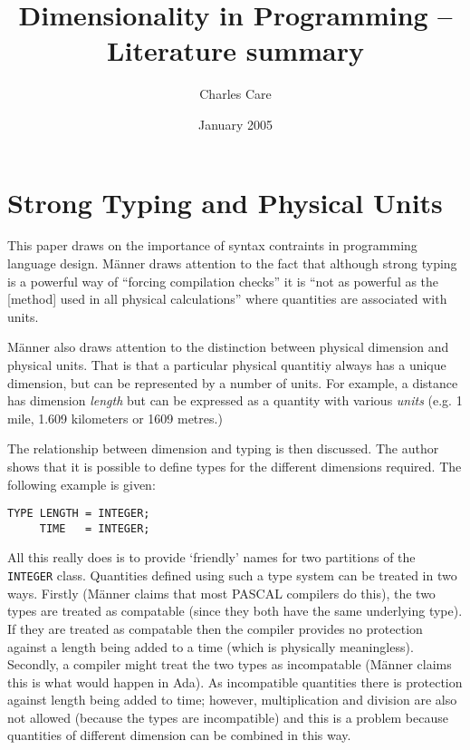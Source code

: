\documentclass[a4paper]{article}
\title{Dimensionality in Programming -- Literature summary}
\author{Charles Care}
\date{January 2005}
\begin{document}
\maketitle

\section{Strong Typing and Physical Units \cite{ME_manner}}

This paper draws on the importance of syntax contraints in programming 
language design. M\"anner draws attention to the fact that although strong 
typing is a powerful way of ``forcing compilation checks'' it is ``not as
powerful as the [method] used in all physical calculations'' where quantities 
are associated with units.

M\"anner also draws attention to the distinction between physical dimension 
and physical units. That is that a particular physical quantitiy always has a 
unique dimension, but can be represented by a number of units.
For example, a distance has dimension \emph{length} but can be expressed 
as a quantity with various \emph{units} (e.g. 1 mile, 1.609 kilometers or 
1609 metres.)

The relationship between dimension and typing is then discussed.
The author shows that it is possible to define types for the different 
dimensions required. The following example is given:

\begin{verbatim}
TYPE LENGTH = INTEGER;
     TIME   = INTEGER;
\end{verbatim}

All this really does is to provide `friendly' names for two partitions of the
\texttt{INTEGER} class. Quantities defined using such a type system can be 
treated in two ways. Firstly (M\"anner claims that most PASCAL compilers 
do this), the two types are treated as compatable (since they both have 
the same underlying type). If they are treated as compatable then the compiler
provides no protection against a length being added to a time (which is 
physically meaningless). Secondly, a compiler might treat the two types as
incompatable (M\"anner claims this is what would happen in Ada). As 
incompatible quantities there is protection against length being added to
time; however, multiplication and division are also not allowed (because the 
types are incompatible) and this is a problem because quantities of 
different dimension can be combined in this way.
\end{document}
